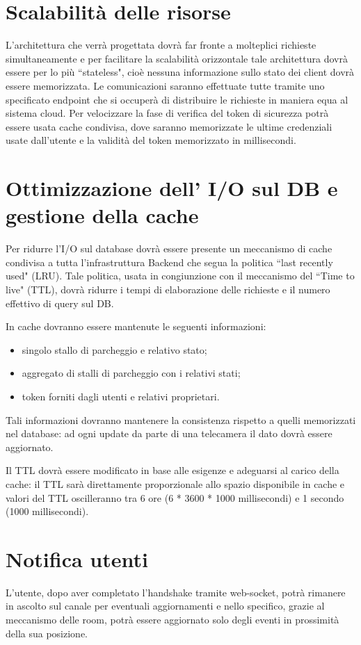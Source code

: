 \section{Scalabilità delle risorse}
L'architettura che verrà progettata dovrà far fronte a molteplici richieste simultaneamente e per facilitare la scalabilità orizzontale tale architettura dovrà essere per lo più ``stateless", cioè nessuna informazione sullo stato dei client dovrà essere memorizzata. Le comunicazioni saranno effettuate tutte tramite uno specificato endpoint che si occuperà di distribuire le richieste in maniera equa al sistema cloud. 
Per velocizzare la fase di verifica del token di sicurezza potrà essere usata cache condivisa, dove saranno memorizzate le ultime credenziali usate dall'utente e la validità del token memorizzato in millisecondi. 



\section{Ottimizzazione dell' I/O sul DB e gestione della cache}
Per ridurre l'I/O sul database dovrà essere presente un meccanismo di cache condivisa a tutta l'infrastruttura Backend che segua la politica ``last recently used" (LRU). 
Tale politica, usata in congiunzione con il meccanismo del ``Time to live" (TTL), dovrà ridurre i tempi di elaborazione delle richieste e il numero effettivo di query sul DB. 

In cache dovranno essere mantenute le seguenti informazioni:

\begin{itemize}
	\item singolo stallo di parcheggio e relativo stato;
	\item aggregato di stalli di parcheggio con i relativi stati;
	\item token forniti dagli utenti e relativi proprietari.
\end{itemize}

Tali informazioni dovranno mantenere la consistenza rispetto a quelli memorizzati nel database: ad ogni update da parte di una telecamera il dato dovrà essere aggiornato. 

Il TTL dovrà essere modificato in base alle esigenze e adeguarsi al carico della cache: il TTL sarà direttamente proporzionale allo spazio disponibile in cache e valori del TTL oscilleranno tra 6 ore (6 * 3600 * 1000 millisecondi) e 1 secondo (1000 millisecondi).


\section{Notifica utenti} 
L'utente, dopo aver completato l'handshake tramite web-socket, potrà rimanere in ascolto sul canale per eventuali aggiornamenti e nello specifico, grazie al meccanismo delle room, potrà essere aggiornato solo degli eventi in prossimità della sua posizione. 
